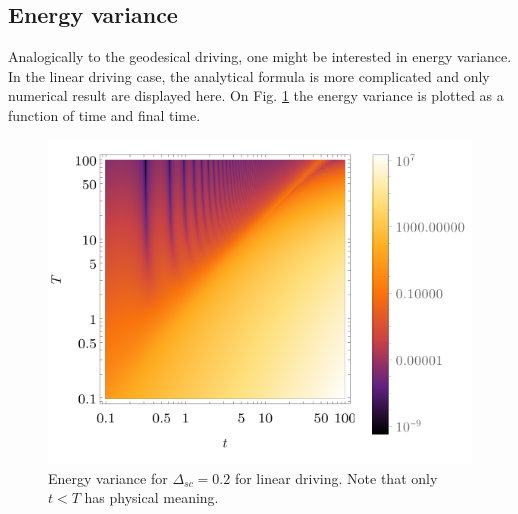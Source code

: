 \subsection{Energy variance}
Analogically to the geodesical driving, one might be interested in energy variance. In the linear driving case, the analytical formula is more complicated and only numerical result are displayed here. On Fig. \ref{fig:densVariance} the energy variance is plotted as a function of time and final time.
\begin{figure}[H]
    \centering
    \includegraphics[scale=1.2]{../img/densVariance.pdf}
    \caption{Energy variance for $\Delta_{sc}=0.2$ for linear driving. Note that only $t<T$ has physical meaning.}
    \label{fig:densVariance}
\end{figure}
















